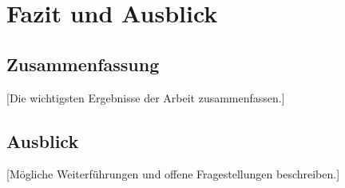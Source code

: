 \chapter{Fazit und Ausblick}
\label{chap:fazit}

\section{Zusammenfassung}

[Die wichtigsten Ergebnisse der Arbeit zusammenfassen.]

\section{Ausblick}

[Mögliche Weiterführungen und offene Fragestellungen beschreiben.]
